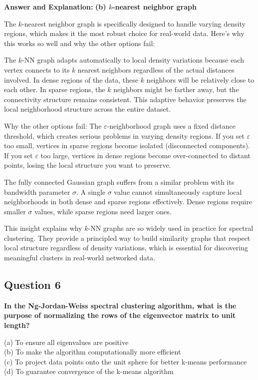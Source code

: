 \documentclass[11pt]{article}
\newenvironment{answer}{\color{answercolor}\begin{framed}\textbf{Answer and Explanation:}}{\end{framed}}
\begin{document}
\begin{answer}
\textbf{(b) $k$-nearest neighbor graph}

The $k$-nearest neighbor graph is specifically designed to handle varying density regions, which makes it the most robust choice for real-world data. Here's why this works so well and why the other options fail:

The $k$-NN graph adapts automatically to local density variations because each vertex connects to its $k$ nearest neighbors regardless of the actual distances involved. In dense regions of the data, these $k$ neighbors will be relatively close to each other. In sparse regions, the $k$ neighbors might be farther away, but the connectivity structure remains consistent. This adaptive behavior preserves the local neighborhood structure across the entire dataset.

Why the other options fail: The $\varepsilon$-neighborhood graph uses a fixed distance threshold, which creates serious problems in varying density regions. If you set $\varepsilon$ too small, vertices in sparse regions become isolated (disconnected components). If you set $\varepsilon$ too large, vertices in dense regions become over-connected to distant points, losing the local structure you want to preserve.

The fully connected Gaussian graph suffers from a similar problem with its bandwidth parameter $\sigma$. A single $\sigma$ value cannot simultaneously capture local neighborhoods in both dense and sparse regions effectively. Dense regions require smaller $\sigma$ values, while sparse regions need larger ones.

This insight explains why $k$-NN graphs are so widely used in practice for spectral clustering. They provide a principled way to build similarity graphs that respect local structure regardless of density variations, which is essential for discovering meaningful clusters in real-world networked data.
\end{answer}

\subsection{Question 6}
\textbf{In the Ng-Jordan-Weiss spectral clustering algorithm, what is the purpose of normalizing the rows of the eigenvector matrix to unit length?}

(a) To ensure all eigenvalues are positive \\
(b) To make the algorithm computationally more efficient \\
(c) To project data points onto the unit sphere for better k-means performance \\
(d) To guarantee convergence of the k-means algorithm
\end{document}
